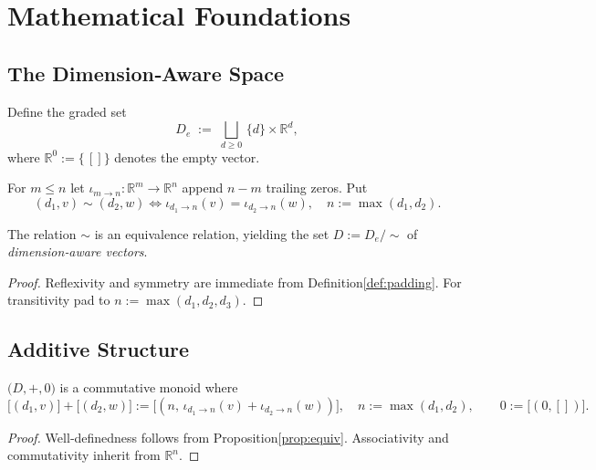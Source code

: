 \section{Mathematical Foundations}
\label{sec:foundations}
\subsection{The Dimension‑Aware Space}
\begin{definition}\label{def:DAspace}
Define the graded set
\[
  D_e\;:=\;\bigsqcup_{d\ge0}\,\{d\}\times\mathbb R^{d},
\]
where \(\mathbb R^{0}:=\{\,[]\}\) denotes the empty vector.
\end{definition}

\begin{definition}\label{def:padding}
For \(m\le n\) let \(\iota_{m\rightarrow n}\colon\mathbb R^{m}\to\mathbb R^{n}\) append \(n-m\) trailing zeros.  Put
\[
  (d_1,v)\sim(d_2,w)
  \iff \iota_{d_1\rightarrow n}(v)=\iota_{d_2\rightarrow n}(w),\quad n:=\max(d_1,d_2).
\]
\end{definition}

\begin{proposition}\label{prop:equiv}
The relation \(\sim\) is an equivalence relation, yielding the set \(D:=D_e/\!\sim\) of \emph{dimension‑aware vectors}.
\end{proposition}
\begin{proof}
Reflexivity and symmetry are immediate from Definition\;\ref{def:padding}.  For transitivity pad to \(n:=\max(d_1,d_2,d_3)\).\end{proof}

\subsection{Additive Structure}
\begin{theorem}\label{thm:add}
\(\bigl(D,+,0\bigr)\) is a commutative monoid where
\[
  \bigl[(d_1,v)\bigr]+\bigl[(d_2,w)\bigr]
  :=\bigl[(n,\,\iota_{d_1\rightarrow n}(v)+\iota_{d_2\rightarrow n}(w))\bigr],
  \quad n:=\max(d_1,d_2),\qquad
  0:=\bigl[(0,[])\bigr].
\]
\end{theorem}
\begin{proof}
Well‑definedness follows from Proposition\;\ref{prop:equiv}. Associativity and commutativity inherit from \(\mathbb R^n\).\end{proof}

